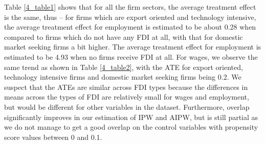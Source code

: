 



Table \ref{4_table1} shows that for all the firm sectors, the average treatment effect is the same, thus – for firms which are export oriented and technology intensive, the average treatment effect for employment is estimated to be about 0.28 when compared to firms which do not have any FDI at all, with that for domestic market seeking firms a bit higher. The average treatment effect for employment is estimated to be 4.93 when no firms receive FDI at all. For wages, we observe the same trend as shown in Table \ref{4_table2}, with the ATE for export oriented,  technology intensive firms and domestic market seeking firms being 0.2. We suspect that the ATEs are similar across FDI types because the differences in means across the types of FDI are relatively small for wages and employment, but would be different for other variables in the dataset. Furthermore, overlap significantly improves in our estimation of IPW and AIPW, but is still partial as we do not manage to get a good overlap on the control variables with propensity score values between 0 and 0.1.